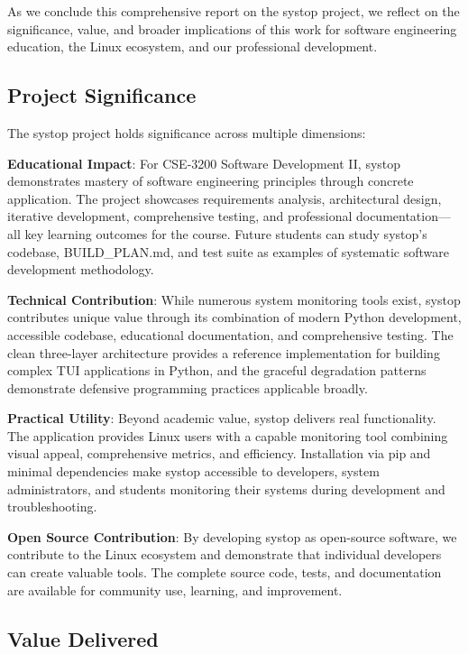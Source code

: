 \documentclass[12pt,a4paper,oneside]{report}
\begin{document}
As we conclude this comprehensive report on the systop project, we reflect on the significance, value, and broader implications of this work for software engineering education, the Linux ecosystem, and our professional development.

\subsection{Project Significance}

The systop project holds significance across multiple dimensions:

\textbf{Educational Impact}: For CSE-3200 Software Development II, systop demonstrates mastery of software engineering principles through concrete application. The project showcases requirements analysis, architectural design, iterative development, comprehensive testing, and professional documentation---all key learning outcomes for the course. Future students can study systop's codebase, BUILD\_PLAN.md, and test suite as examples of systematic software development methodology.

\textbf{Technical Contribution}: While numerous system monitoring tools exist, systop contributes unique value through its combination of modern Python development, accessible codebase, educational documentation, and comprehensive testing. The clean three-layer architecture provides a reference implementation for building complex TUI applications in Python, and the graceful degradation patterns demonstrate defensive programming practices applicable broadly.

\textbf{Practical Utility}: Beyond academic value, systop delivers real functionality. The application provides Linux users with a capable monitoring tool combining visual appeal, comprehensive metrics, and efficiency. Installation via pip and minimal dependencies make systop accessible to developers, system administrators, and students monitoring their systems during development and troubleshooting.

\textbf{Open Source Contribution}: By developing systop as open-source software, we contribute to the Linux ecosystem and demonstrate that individual developers can create valuable tools. The complete source code, tests, and documentation are available for community use, learning, and improvement.

\subsection{Value Delivered}
\end{document}
